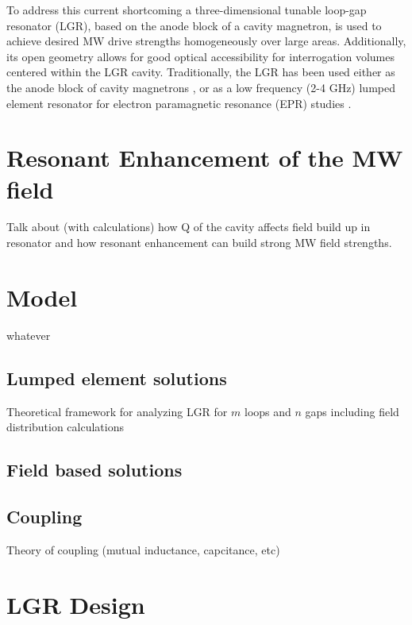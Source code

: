 To address this current shortcoming a three-dimensional tunable loop-gap resonator (LGR), based on the anode block of a cavity magnetron, is used to achieve desired MW drive strengths homogeneously over large areas. Additionally, its open geometry allows for good optical accessibility for interrogation volumes centered within the LGR cavity. Traditionally, the LGR has been used either as the anode block of cavity magnetrons \cite{}, or as a low frequency (2-4 GHz) lumped element resonator for electron paramagnetic resonance (EPR) studies \cite{}.  

\section{Resonant Enhancement of the MW field}

Talk about (with calculations) how Q of the cavity affects field build up in resonator and how resonant enhancement can build strong MW field strengths.

\section{Model}

whatever

\subsection{Lumped element solutions} \label{circuit}

Theoretical framework for analyzing LGR for $m$ loops and $n$ gaps including field distribution calculations

\subsection{Field based solutions}

\subsection{Coupling}

Theory of coupling (mutual inductance, capcitance, etc)

\section{LGR Design}

